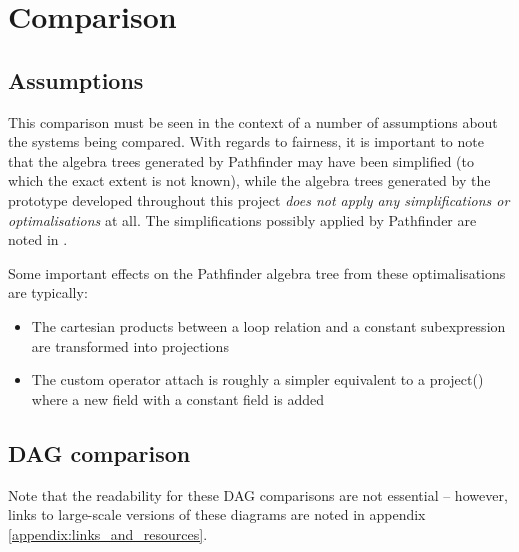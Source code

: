 \section{Comparison}
\label{sect:results:comparison}
\subsection{Assumptions}
This comparison must be seen in the context of a number of assumptions
about the systems being compared. With regards to fairness, it is important to
note that the algebra trees generated by Pathfinder may have been
simplified (to which the exact extent is not known), while the algebra trees
generated by the prototype developed throughout this project \emph{does not
apply any simplifications or optimalisations} at all. The simplifications
possibly applied by Pathfinder are noted in \cite{pathfinder_purelyRelational}.

Some important effects on the Pathfinder algebra tree from these
optimalisations are typically:
\begin{itemize}
  \item The cartesian products between a loop relation and a constant
  subexpression are transformed into projections
  \item The custom operator \textsf{attach} is roughly a simpler equivalent to
  a \textsf{project()} where a new field with a constant field is added
\end{itemize}

\newpage
\subsection{DAG comparison}
Note that the readability for these DAG comparisons are not essential --
however, links to large-scale versions of these diagrams are noted in appendix
\ref{appendix:links_and_resources}.

